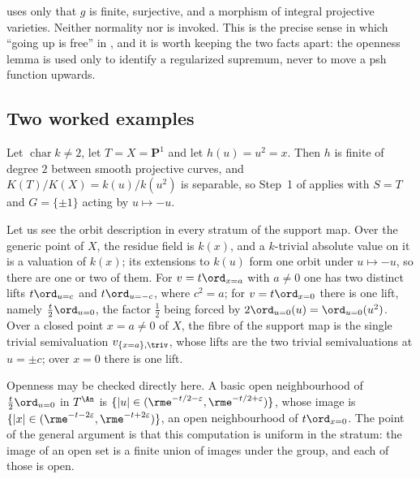 \begin{remark}
\label{rem:ch41-pullback-cheap}
 uses only that $g$ is finite, surjective,
and a morphism of integral projective varieties.  Neither normality nor
 is invoked.  This is the precise sense in
which ``going up is free'' in , and it is worth keeping
the two facts apart: the openness lemma is used only to identify a
regularized supremum, never to move a psh function upwards.
\end{remark}

\subsection{Two worked examples}
\label{sec:ch41-openness-examples}

\begin{example}
\label{ex:ch41-openness-p1}
Let $\operatorname{char}k\ne2$, let $T=X=\mathbf P^1$ and let
$h(u)=u^2=x$.  Then $h$ is finite of degree $2$ between smooth
projective curves, and $K(T)/K(X)=k(u)/k(u^2)$ is separable, so Step~1 of
 applies with $S=T$ and
$G=\{\pm1\}$ acting by $u\mapsto-u$.

Let us see the orbit description in every stratum of the support map.
Over the generic point of $X$, the residue field is $k(x)$, and a
$k$-trivial absolute value on it is a valuation of $k(x)$; its
extensions to $k(u)$ form one orbit under $u\mapsto-u$, so there are one
or two of them.  For
$v=t\ord_{x=a}$ with $a\ne0$ one has two distinct lifts
$t\ord_{u=c}$ and $t\ord_{u=-c}$, where $c^2=a$; for $v=t\ord_{x=0}$
there is one lift, namely $\tfrac t2\ord_{u=0}$, the factor $\tfrac12$
being forced by $2\ord_{u=0}(u)=\ord_{u=0}(u^2)$.  Over a closed point
$x=a\ne0$ of $X$, the fibre of the support map is the single trivial
semivaluation $v_{\{x=a\},\triv}$, whose lifts are the two trivial
semivaluations at $u=\pm c$; over $x=0$ there is one lift.

Openness may be checked directly here.  A basic open neighbourhood of
$\tfrac t2\ord_{u=0}$ in $T^{\An}$ is
$\{|u|\in(\rme^{-t/2-\varepsilon},\rme^{-t/2+\varepsilon})\}$, whose image
is $\{|x|\in(\rme^{-t-2\varepsilon},\rme^{-t+2\varepsilon})\}$, an open
neighbourhood of $t\ord_{x=0}$.  The point of the general argument is that
this computation is uniform in the stratum: the image of an open set is a
finite union of images under the group, and each of those is open.
\end{example}

